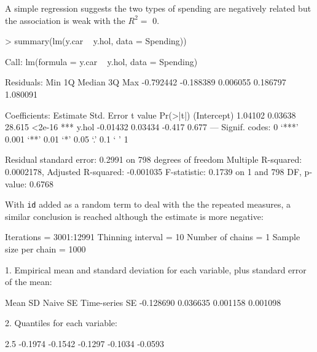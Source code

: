 \documentclass{article}
\begin{document}
A simple regression suggests the two types of spending are negatively related but the association is weak with the $R^{2}=$ 0.

\begin{Schunk}
\begin{Sinput}
> summary(lm(y.car ~ y.hol, data = Spending))
\end{Sinput}
\begin{Soutput}
Call:
lm(formula = y.car ~ y.hol, data = Spending)

Residuals:
      Min        1Q    Median        3Q       Max 
-0.792442 -0.188389  0.006055  0.186797  1.080091 

Coefficients:
            Estimate Std. Error t value Pr(>|t|)    
(Intercept)  1.04102    0.03638  28.615   <2e-16 ***
y.hol       -0.01432    0.03434  -0.417    0.677    
---
Signif. codes:  0 ‘***’ 0.001 ‘**’ 0.01 ‘*’ 0.05 ‘.’ 0.1 ‘ ’ 1 

Residual standard error: 0.2991 on 798 degrees of freedom
Multiple R-squared: 0.0002178,	Adjusted R-squared: -0.001035 
F-statistic: 0.1739 on 1 and 798 DF,  p-value: 0.6768 
\end{Soutput}
\end{Schunk}

With \texttt{id} added as a random term to deal with the the repeated measures, a similar conclusion is reached although the estimate is more negative:

\iftalk
\else
\fi

\begin{Schunk}
\begin{Soutput}
Iterations = 3001:12991
Thinning interval = 10 
Number of chains = 1 
Sample size per chain = 1000 

1. Empirical mean and standard deviation for each variable,
   plus standard error of the mean:

          Mean             SD       Naive SE Time-series SE 
     -0.128690       0.036635       0.001158       0.001098 

2. Quantiles for each variable:

   2.5%
-0.1974 -0.1542 -0.1297 -0.1034 -0.0593 
\end{Soutput}
\end{Schunk}
\end{document}
